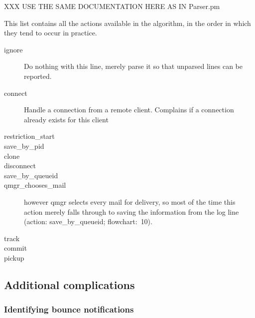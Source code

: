 \documentclass[a4paper,12pt,draft]{article}
\begin{document}
\label{actions-in-detail}

XXX USE THE SAME DOCUMENTATION HERE AS IN Parser.pm

This list contains all the actions available in the algorithm, in the order
in which they tend to occur in practice.

\begin{description}

    \item [ignore] Do nothing with this line, merely parse it so that
        unparsed lines can be reported.

    \item [connect] Handle a connection from a remote client.  Complains if
        a connection already exists for this client

    \item [restriction\_start] 

    \item [save\_by\_pid] 

    \item [clone] 

    \item [disconnect] 

    \item [save\_by\_queueid] 

    \item [qmgr\_chooses\_mail] 
        however qmgr selects every mail for delivery, so most of the time
        this action merely falls through to saving the information from the
        log line (action: save\_by\_queueid; flowchart:~10).

    \item [track] 

    \item [commit] 

    \item [pickup] 

\end{description}

\subsection{Additional complications}

\subsubsection{Identifying bounce notifications}

\label{identifying-bounce-notifications}
\end{document}
